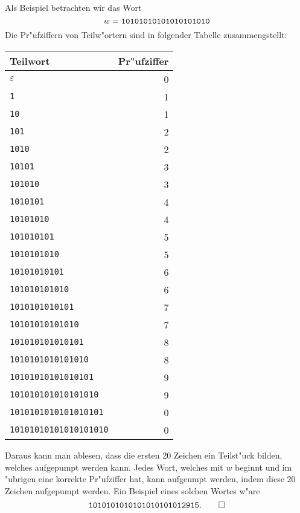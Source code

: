 \begin{loesung}
Als Beispiel betrachten wir das Wort
\[
w=\text{\tt 10101010101010101010}
\]
Die Pr"ufziffern von Teilw"ortern sind in folgender Tabelle
zusammengstellt:
\begin{center}
\begin{tabular}{|l|r|}
\hline
Teilwort&Pr"ufziffer\\
\hline
$\varepsilon$             &0\\
{\tt 1}                   &1\\
{\tt 10}                  &1\\
{\tt 101}                 &2\\
{\tt 1010}                &2\\
{\tt 10101}               &3\\
{\tt 101010}              &3\\
{\tt 1010101}             &4\\
{\tt 10101010}            &4\\
{\tt 101010101}           &5\\
{\tt 1010101010}          &5\\
{\tt 10101010101}         &6\\
{\tt 101010101010}        &6\\
{\tt 1010101010101}       &7\\
{\tt 10101010101010}      &7\\
{\tt 101010101010101}     &8\\
{\tt 1010101010101010}    &8\\
{\tt 10101010101010101}   &9\\
{\tt 101010101010101010}  &9\\
{\tt 1010101010101010101} &0\\
{\tt 10101010101010101010}&0\\
\hline
\end{tabular}
\end{center}
Daraus kann man ablesen, dass die ersten 20 Zeichen ein Teilst"uck
bilden, welches aufgepumpt werden kann. Jedes Wort, welches mit
$w$ beginnt und im "ubrigen eine korrekte Pr"ufziffer hat, kann
aufgeumpt werden, indem diese 20 Zeichen aufgepumpt werden.
Ein Beispiel eines solchen Wortes w"are
\[
\text{\tt 1010101010101010101012915}.
\qedhere
\]
\end{loesung}
